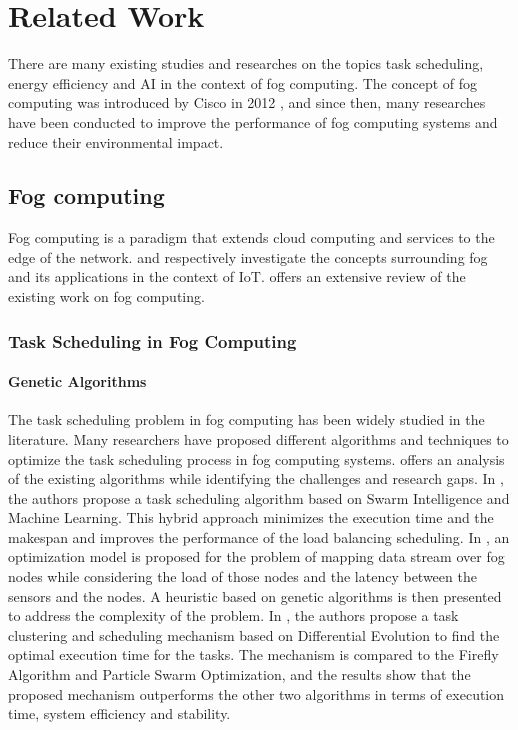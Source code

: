\chapter*{Related Work}
\label{chap:relatedwork}

There are many existing studies and researches on the topics task scheduling, energy efficiency and AI in the context
of fog computing. The concept of fog computing was introduced by Cisco in 2012 \cite{bonomi-et-al-2012}, and since
then, many researches have been conducted to improve the performance of fog computing systems and reduce their
environmental impact.

\section*{Fog computing}

Fog computing is a paradigm that extends cloud computing and services to the edge of the network.
\cite{rana-abubacker-2023} and \cite{abubacker-et-al-2023} respectively investigate the concepts surrounding fog
and its applications in the context of IoT. \cite{al-musawi-et-al-2023} offers an extensive review of the existing
work on fog computing.

\subsection*{Task Scheduling in Fog Computing}

\subsubsection*{Genetic Algorithms}

The task scheduling problem in fog computing has been widely studied in the literature. Many researchers have proposed
different algorithms and techniques to optimize the task scheduling process in fog computing systems.
\cite{misirli-casalicchio-2024} offers an analysis of the existing algorithms while identifying the challenges and
research gaps. In \cite{rjoub-bentahar-2017}, the authors propose a task scheduling algorithm based on Swarm
Intelligence and Machine Learning. This hybrid approach minimizes the execution time and the makespan and improves the
performance of the load balancing scheduling. In \cite{canali-lancellotti-2019}, an optimization model is proposed for
the problem of mapping data stream over fog nodes while considering the load of those nodes and the latency between the
sensors and the nodes. A heuristic based on genetic algorithms is then presented to address the complexity of the
problem. In \cite{yousif-et-al-2024}, the authors propose a task clustering and scheduling mechanism based on
Differential Evolution to find the optimal execution time for the tasks. The mechanism is compared to the Firefly
Algorithm and Particle Swarm Optimization, and the results show that the proposed mechanism outperforms the other two
algorithms in terms of execution time, system efficiency and stability.

